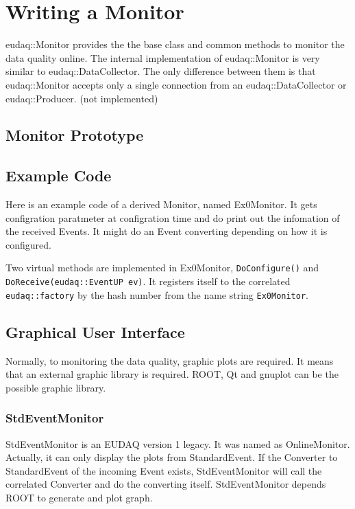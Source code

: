 \section{Writing a Monitor}\label{sec:MonitorWriting}
eudaq::Monitor provides the the base class and common methods to monitor the data quality online. The internal implementation of eudaq::Monitor is very similar to eudaq::DataCollector. The only difference between them is that eudaq::Monitor accepts only a single connection from an eudaq::DataCollector or eudaq::Producer. (not implemented)\\

\subsection{Monitor Prototype}\label{sec:monitor_hh}



\subsection{Example Code}
Here is an example code of a derived Monitor, named Ex0Monitor. It gets configration paratmeter at configration time and do print out the infomation of the received Events. It might do an Event converting depending on how it is configured.

Two virtual methods are implemented in Ex0Monitor, \lstinline[style=cpp]{DoConfigure()} and \lstinline[style=cpp]{DoReceive(eudaq::EventUP ev)}. It registers itself to the correlated \lstinline[style=cpp]{eudaq::factory} by the hash number from the name string \lstinline[style=cpp]{Ex0Monitor}.

\subsection{Graphical User Interface}
Normally, to monitoring the data quality, graphic plots are required. It means that an external graphic library is required. ROOT, Qt
and gnuplot can be the possible graphic library.

\subsubsection{StdEventMonitor}
StdEventMonitor is an EUDAQ version 1 legacy. It was named as OnlineMonitor. Actually, it can only display the plots from StandardEvent. If the Converter to StandardEvent of the incoming Event exists, StdEventMonitor will call the correlated Converter and do the converting itself.
StdEventMonitor depends ROOT to generate and plot graph.
